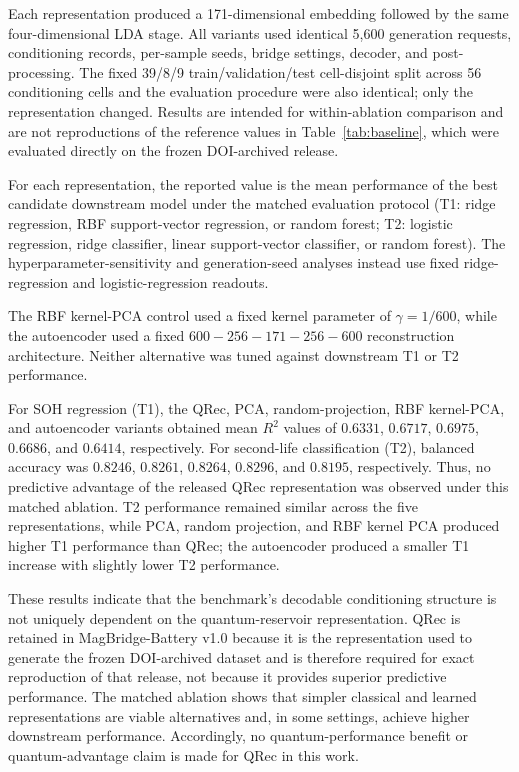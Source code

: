 \documentclass[11pt]{article}
\begin{document}
Each representation produced a 171-dimensional embedding
followed by the same four-dimensional LDA stage. All
variants used identical 5,600 generation requests,
conditioning records, per-sample seeds, bridge settings,
decoder, and post-processing. The fixed 39/8/9
train/validation/test cell-disjoint split across
56 conditioning cells and the evaluation procedure
were also identical; only the representation changed. Results are intended for within-ablation comparison
and are not reproductions of the reference values in
Table~\ref{tab:baseline}, which were evaluated directly
on the frozen DOI-archived release.

For each representation, the reported value is the mean performance of the best candidate downstream model under the matched evaluation protocol (T1: ridge regression, RBF support-vector regression, or random forest; T2: logistic regression, ridge classifier, linear support-vector classifier, or random forest). The hyperparameter-sensitivity and generation-seed analyses instead use fixed ridge-regression and logistic-regression readouts.

The RBF kernel-PCA control used a fixed kernel parameter of
$\gamma=1/600$, while the autoencoder used a fixed
$600\!-\!256\!-\!171\!-\!256\!-\!600$ reconstruction architecture.
Neither alternative was tuned against downstream T1 or T2 performance.

For SOH regression (T1), the QRec, PCA, random-projection, RBF
kernel-PCA, and autoencoder variants obtained mean $R^2$ values of
$0.6331$, $0.6717$, $0.6975$, $0.6686$, and $0.6414$, respectively.
For second-life classification (T2), balanced accuracy was $0.8246$,
$0.8261$, $0.8264$, $0.8296$, and $0.8195$, respectively. Thus, no
predictive advantage of the released QRec representation was observed
under this matched ablation. T2 performance remained similar across the
five representations, while PCA, random projection, and RBF kernel PCA
produced higher T1 performance than QRec; the autoencoder produced a
smaller T1 increase with slightly lower T2 performance.

These results indicate that the benchmark's decodable conditioning structure is not uniquely dependent on the quantum-reservoir representation. QRec is retained in MagBridge-Battery v1.0 because it is the representation used to generate the
frozen DOI-archived dataset and is therefore required for exact reproduction of that release, not because it provides superior predictive performance. The matched ablation shows that simpler classical and learned representations are viable alternatives and, in some settings, achieve higher downstream performance. Accordingly, no quantum-performance benefit or quantum-advantage
claim is made for QRec in this work.
\end{document}

